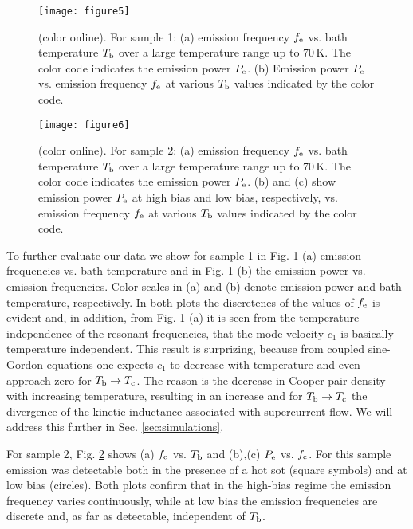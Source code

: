 \documentclass[aps,twocolumn,prb,showpacs,preprintnumbers,superscriptaddress,amsmath,amssymb,longbibliography]{revtex4-1}
\begin{document}
\begin{figure}[b]
\texttt{[image: figure5]}
\caption{(color online). For sample 1: (a) emission frequency $f_{\rm e}$ vs. bath temperature $T_{\rm b}$ over a large temperature range up to 70\,K. The color code indicates the emission power $P_{\rm e}$. (b) Emission power $P_{\rm e}$ vs. emission frequency $f_{\rm e}$ at various $T_{\rm b}$ values indicated by the color code.
 }
\label{fig:eval1}
\end{figure}

\begin{figure}[b]
\texttt{[image: figure6]}
\caption{(color online). For sample 2: (a) emission frequency $f_{\rm e}$ vs. bath temperature $T_{\rm b}$ over a large temperature range up to 70\,K. The color code indicates the emission power $P_{\rm e}$. (b) and (c) show emission power $P_{\rm e}$ at high bias and low bias, respectively, vs. emission frequency $f_{\rm e}$ at various $T_{\rm b}$ values indicated by the color code.
}
\label{fig:eval2}
\end{figure}

To further evaluate our data we show for sample 1 in Fig. \ref{fig:eval1} (a) emission frequencies vs. bath temperature and in Fig. \ref{fig:eval1} (b) the emission power vs. emission frequencies. Color scales in (a) and (b) denote emission power and bath temperature, respectively. In both plots the discretenes of the values of $f_{\rm e}$ is evident and, in addition, from Fig. \ref{fig:eval1} (a) it is seen from the temperature-independence of the resonant frequencies, that the mode velocity $c_1$ is basically temperature independent. This result is surprizing, because from coupled sine-Gordon equations one expects $c_1$ to decrease with temperature and even approach zero for $T_{\rm b} \rightarrow T_{\rm c}$. The reason is the decrease in Cooper pair density with increasing temperature, resulting in an increase and for $T_{\rm b} \rightarrow T_{\rm c}$ the divergence of the kinetic inductance associated with supercurrent flow.
We will address this further in Sec. \ref{sec:simulations}.

For sample 2, Fig. \ref{fig:eval2} shows (a) $f_{\rm e}$ vs. $T_{\rm b}$ and (b),(c) $P_{\rm e}$ vs. $f_{\rm e}$. For this sample emission was detectable both in the presence of a hot sot (square symbols) and at low bias (circles). Both plots confirm that in the high-bias regime the emission frequency varies continuously, while at low bias the emission frequencies are discrete and, as far as detectable, independent of $T_{\rm b}$. 
\end{document}
